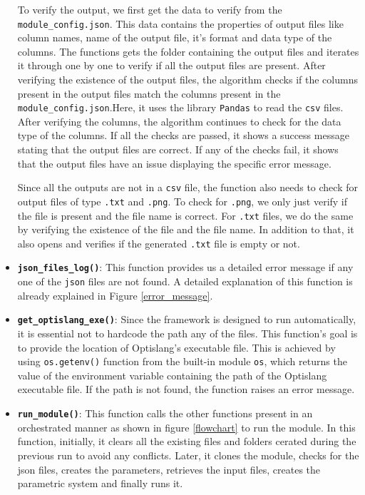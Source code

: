\begin{itemize}
  To verify the output, we first get the data to verify from the \texttt{module\_config.json}. This data contains the properties of output files like column 
  names, name of the output file, it's format and data type of the columns. The functions gets the folder containing the output files and iterates it through
  one by one to verify if all the output files are present. After verifying the existence of the output files, the algorithm checks if the columns present in
  the output files match the columns present in the \texttt{module\_config.json}.Here, it uses the library \texttt{Pandas} to read the \texttt{csv} files. 
  After verifying the columns, the algorithm continues to check for the data type of the columns. If all the checks are passed, it shows a success message 
  stating that the output files are correct. If any of the checks fail, it shows that the output files have an issue displaying the specific error message.

  Since all the outputs are not in a \texttt{csv} file, the function also needs to check for output files of type \texttt{.txt} and \texttt{.png}. To check
  for \texttt{.png}, we only just verify if the file is present and the file name is correct. For \texttt{.txt} files, we do the same by verifying the existence
  of the file and the file name. In addition to that, it also opens and verifies if the generated \texttt{.txt} file is empty or not.  

  \item \textbf{\texttt{json\_files\_log()}}:\newline
  This function provides us a detailed error message if any one of the \texttt{\acrshort{json}} files are not found. A detailed explanation of this function
  is already explained in Figure \ref{error_message}.

  \item \textbf{\texttt{get\_optislang\_exe()}}:\newline
  Since the framework is designed to run automatically, it is essential not to hardcode the path any of the files. This function's goal is to provide the location
  of Optislang's executable file. This is achieved by using \texttt{os.getenv()} function from the built-in module \texttt{os}, which returns the value of the environment variable containing the
  path of the Optislang executable file. If the path is not found, the function raises an error message.

  \item \textbf{\texttt{run\_module()}}:\newline
  This function calls the other functions present in an orchestrated manner as shown in figure \ref{flowchart} to run the module. In this function, initially, 
  it clears all the existing files and folders cerated during the previous run to avoid any conflicts. Later, it clones the module, checks for the \acrshort{json}
  files, creates the parameters, retrieves the input files, creates the parametric system and finally runs it.  

\end{itemize}

